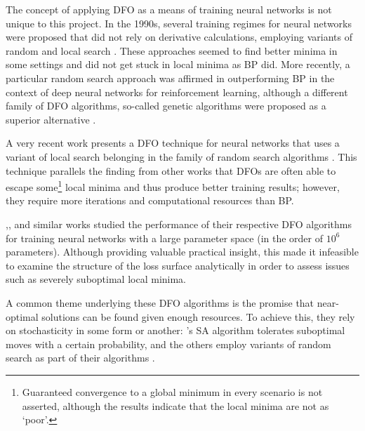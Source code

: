 The concept of applying DFO as a means of training neural networks is not unique to this project.
In the 1990s, several training regimes for neural networks were proposed that did not rely on derivative calculations, employing variants of random and local search \cite{hirasawa1998,battiti1995}.
These approaches seemed to find better minima in some settings and did not get stuck in local minima as BP did. 
More recently, a particular random search approach was affirmed in outperforming BP in the context of deep neural networks for reinforcement learning, although a different family of DFO algorithms, so-called genetic algorithms were proposed as a superior alternative \cite{such2017}.

A very recent work presents a DFO technique for neural networks that uses a variant of local search belonging in the family of random search algorithms \cite{aly2019}.
This technique parallels the finding from other works that DFOs are often able to escape some\footnote{Guaranteed convergence to a global minimum in every scenario is not asserted, although the results indicate that the local minima are not as `poor'.} local minima and thus produce better training results; however, they require more iterations and computational resources than BP. 

\citeauthor{aly2019},\citeauthor{such2017}, and similar works studied the performance of their respective DFO algorithms for training neural networks with a large parameter space (in the order of $10^6$ parameters).
Although providing valuable practical insight, this made it infeasible to examine the structure of the loss surface analytically in order to assess issues such as severely suboptimal local minima.

A common theme underlying these DFO algorithms is the promise that near-optimal solutions can be found given enough resources. 
To achieve this, they rely on stochasticity in some form or another: 
\citeauthor{kirkpatrick1983}'s SA algorithm tolerates suboptimal moves with a certain probability, and the others employ variants of random search as part of their algorithms \cite{hirasawa1998,battiti1995,aly2019,such2017}.


